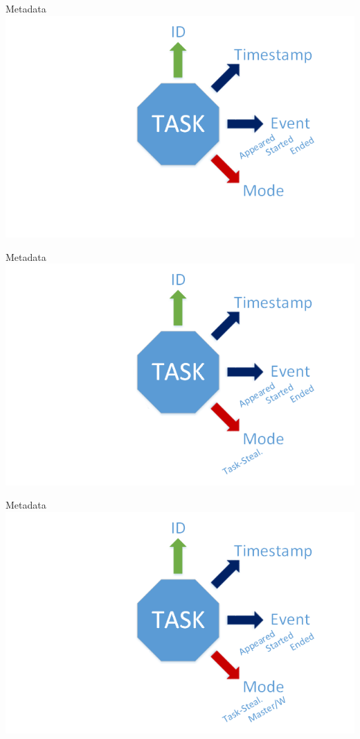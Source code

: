 	\begin{frame}{Metadata}
	\includegraphics[width=1.0\textwidth]{images/Task/metadata8.png}
	\end{frame}
	
	\begin{frame}{Metadata}
	\includegraphics[width=1.0\textwidth]{images/Task/metdatada9.png}
	\end{frame}
	
	\begin{frame}{Metadata}
	\includegraphics[width=1.0\textwidth]{images/Task/metadata10.png}
	\end{frame}
	

